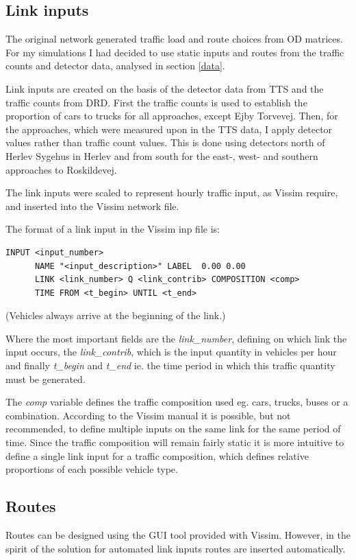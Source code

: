 \subsection{Link inputs}
The original network generated traffic load and route choices from OD matrices. For my simulations I had decided to use static inputs and routes from the traffic counts and detector data, analysed in section \ref{data}. 

Link inputs are created on the basis of the detector data from TTS and the traffic counts from DRD. First the traffic counts is used to establish the proportion of cars to trucks for all approaches, except Ejby Torvevej. Then, for the approaches, which were measured upon in the TTS data, I apply detector values rather than traffic count values. This is done using detectors north of Herlev Sygehus in Herlev and from south for the east-, west- and southern approaches to Roskildevej.

The link inputs were scaled to represent hourly traffic input, as Vissim require, and inserted into the Vissim network file.

The format of a link input in the Vissim inp file is:
\begin{verbatim}
INPUT <input_number>
      NAME "<input_description>" LABEL  0.00 0.00
      LINK <link_number> Q <link_contrib> COMPOSITION <comp>
      TIME FROM <t_begin> UNTIL <t_end>
\end{verbatim}

(Vehicles always arrive at the beginning of the link.)

Where the most important fields are the \textit{link\_number}, defining on which link the input occurs, the \textit{link\_contrib}, which is the input quantity in vehicles per hour and finally \textit{t\_begin} and \textit{t\_end} ie. the time period in which this traffic quantity must be generated.

The \textit{comp} variable defines the traffic composition used eg. cars, trucks, buses or a combination. According to the Vissim manual it is possible, but not recommended, to define multiple inputs on the same link for the same period of time. Since the traffic composition will remain fairly static it is more intuitive to define a single link input for a traffic composition, which defines relative proportions of each possible vehicle type.

\subsection{Routes}
\label{routefractions}
Routes can be designed using the GUI tool provided with Vissim. However, in the spirit of the solution for automated link inputs routes are inserted automatically. 

